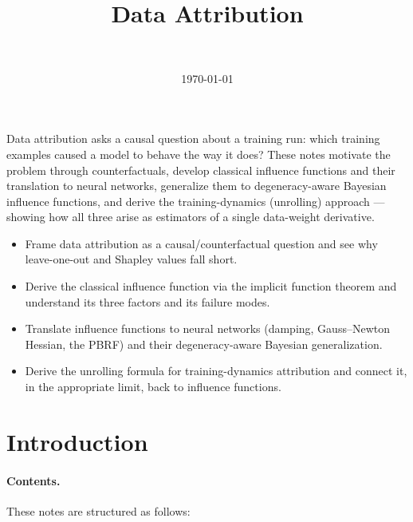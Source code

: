 \documentclass[11pt]{article}
\title{Data Attribution}
\author{\authorname{Louis Jaburi}\\ \affiliation{EleutherAI}}
\date{\today}
\begin{document}
\maketitle

\begin{summary}
Data attribution asks a causal question about a training run: which training examples caused a model to behave the way it does? These notes motivate the problem through counterfactuals, develop classical influence functions and their translation to neural networks, generalize them to degeneracy-aware Bayesian influence functions, and derive the training-dynamics (unrolling) approach --- showing how all three arise as estimators of a single data-weight derivative.
\end{summary}

\begin{learningoutcomes}
\begin{itemize}
  \item Frame data attribution as a causal/counterfactual question and see why leave-one-out and Shapley values fall short.
  \item Derive the classical influence function via the implicit function theorem and understand its three factors and its failure modes.
  \item Translate influence functions to neural networks (damping, Gauss--Newton Hessian, the PBRF) and their degeneracy-aware Bayesian generalization.
  \item Derive the unrolling formula for training-dynamics attribution and connect it, in the appropriate limit, back to influence functions.
\end{itemize}
\end{learningoutcomes}

\section*{Introduction}


\paragraph{Contents.} These notes are structured as follows:
\end{document}
